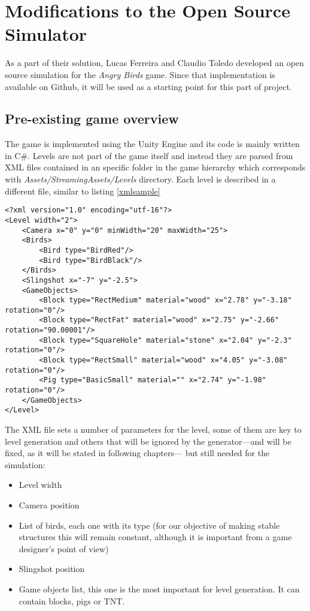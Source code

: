 \chapter{Modifications to the Open Source Simulator}\label{ch:gameApdaptation}
As a part of their solution, Lucas Ferreira and Claudio Toledo\cite{ferreira2014search} developed an open source simulation for the \textit{Angry Birds} game. Since that implementation is available on Github, it will be used as a starting point for this part of project.

\section{Pre-existing game overview}
The game is implemented using the Unity Engine and its code is mainly written in C\#. Levels are not part of the game itself and instead they are parsed from XML files contained in an specific folder in the game hierarchy which corresponds with \textit{Assets/StreamingAssets/Levels} directory. Each level is described in a different file, similar to listing \ref{xmlsample}
\lstset{language=XML}
\begin{lstlisting}[caption=Sample level input to show format, label=xmlsample]
<?xml version="1.0" encoding="utf-16"?>
<Level width="2">
	<Camera x="0" y="0" minWidth="20" maxWidth="25">
	<Birds>
		<Bird type="BirdRed"/>
		<Bird type="BirdBlack"/>
	</Birds>
	<Slingshot x="-7" y="-2.5">
	<GameObjects>
		<Block type="RectMedium" material="wood" x="2.78" y="-3.18" rotation="0"/>
		<Block type="RectFat" material="wood" x="2.75" y="-2.66" rotation="90.00001"/>
		<Block type="SquareHole" material="stone" x="2.04" y="-2.3" rotation="0"/>
		<Block type="RectSmall" material="wood" x="4.05" y="-3.08" rotation="0"/>
		<Pig type="BasicSmall" material="" x="2.74" y="-1.98" rotation="0"/>
	</GameObjects>
</Level>
\end{lstlisting}
The XML file sets a number of parameters for the level, some of them are key to level generation and others that will be ignored by the generator---and will be fixed, as it will be stated in following chapters--- but still needed for the simulation:
\begin{itemize}
	\item Level width 
	\item Camera position
	\item List of birds, each one with its type (for our objective of making stable structures this will remain constant, although it is important from a game designer's point of view)
	\item Slingshot position
	\item Game objects list, this one is the most important for level generation. It can contain blocks, pigs or TNT.
\end{itemize}

